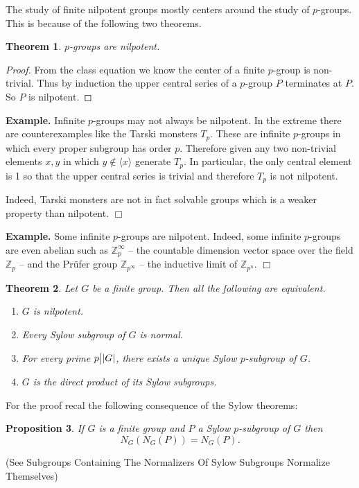\documentclass[12pt]{article}
\newtheorem{thm}{Theorem}
\newtheorem{prop}[thm]{Proposition}
\newenvironment{example}{\textbf{Example.}  }{$\Box$}
\begin{document}
The study of finite nilpotent groups mostly centers around the study of $p$-groups.  This is because of the following two theorems.

\begin{thm}
 $p$-groups are nilpotent.
\end{thm}
\begin{proof}
From the class equation we know the center of a finite $p$-group is non-trivial.
Thus by induction the upper central series of a $p$-group $P$ terminates at $P$.
So $P$ is nilpotent.
\end{proof}


\begin{example}
Infinite $p$-groups may not always be nilpotent.  In the extreme there are counterexamples like the Tarski monsters $T_p$.  These are infinite $p$-groups in which every proper subgroup has order $p$.  Therefore given any two non-trivial elements $x,y$ in which $y\notin \langle x\rangle$ generate $T_p$.  In particular, the only central element is 1 so that the upper central series is trivial and therefore $T_p$ is not nilpotent. 

Indeed, Tarski monsters are not in fact solvable groups which is a weaker property than nilpotent.
\end{example}

\begin{example}
Some infinite $p$-groups are nilpotent.  Indeed, some infinite $p$-groups are even abelian such as $\mathbb{Z}_p^\infty$ -- the countable dimension vector space over the field $\mathbb{Z}_p$ -- and the Pr\"ufer group $\mathbb{Z}_{p^\infty}$ -- the inductive limit of $\mathbb{Z}_{p^n}$.
\end{example}

\begin{thm}\label{thm:nil}
Let $G$ be a finite group.  Then all the following are equivalent.
\begin{enumerate}
\item\label{nil:1} $G$ is nilpotent.
\item\label{nil:2} Every Sylow subgroup of $G$ is normal.
\item\label{nil:3} For every prime $p\big{|}|G|$, there exists a unique Sylow $p$-subgroup of $G$.
\item\label{nil:4} $G$ is the direct product of its Sylow subgroups.
\end{enumerate}
\end{thm}

For the proof recal the following consequence of the Sylow theorems:
\begin{prop}
If $G$ is a finite group and $P$ a Sylow $p$-subgroup of $G$ then
 \[ N_G(N_G(P)) = N_G(P).\]
\end{prop}
(See Subgroups Containing The Normalizers Of Sylow Subgroups Normalize Themselves)
\end{document}
